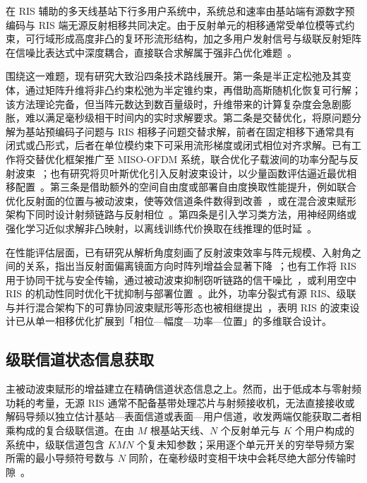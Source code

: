 在 RIS 辅助的多天线基站下行多用户系统中，系统总和速率由基站端有源数字预编码与 RIS 端无源反射相移共同决定。由于反射单元的相移通常受单位模等式约束，可行域形成高度非凸的复环形流形结构，加之多用户发射信号与级联反射矩阵在信噪比表达式中深度耦合，直接联合求解属于强非凸优化难题~\cite{wu2019intelligent}。

围绕这一难题，现有研究大致沿四条技术路线展开。第一条是半正定松弛及其变体，通过矩阵升维将非凸约束松弛为半定锥约束，再借助高斯随机化恢复可行解；该方法理论完备，但当阵元数达到数百量级时，升维带来的计算复杂度会急剧膨胀，难以满足毫秒级相干时间内的实时求解要求。第二条是交替优化，将原问题分解为基站预编码子问题与 RIS 相移子问题交替求解，前者在固定相移下通常具有闭式或凸形式，后者在单位模约束下可采用流形梯度或闭式相位对齐求解。已有工作将交替优化框架推广至 MISO-OFDM 系统，联合优化子载波间的功率分配与反射波束~\cite{feng2021ris}；也有研究将贝叶斯优化引入反射波束设计，以少量函数评估逼近最优相移配置~\cite{wang2022ris}。第三条是借助额外的空间自由度或部署自由度换取性能提升，例如联合优化反射面的位置与被动波束，使等效信道条件数得到改善~\cite{guo2023ris}，或在混合波束赋形架构下同时设计射频链路与反射相位~\cite{saqib2024ris}。第四条是引入学习类方法，用神经网络或强化学习近似求解非凸映射，以离线训练代价换取在线推理的低时延~\cite{yang2021deep,yuan2024ris}。

在性能评估层面，已有研究从解析角度刻画了反射波束效率与阵元规模、入射角之间的关系，指出当反射面偏离镜面方向时阵列增益会显著下降~\cite{stratidakis2021ris}；也有工作将 RIS 用于协同干扰与安全传输，通过被动波束抑制窃听链路的信干噪比~\cite{li2022ris}，或利用空中 RIS 的机动性同时优化干扰抑制与部署位置~\cite{tang2021ris}。此外，功率分裂式有源 RIS、级联与并行混合架构下的可靠协同波束赋形等形态也被相继提出~\cite{ma2023ris,elsherbini2023ris}，表明 RIS 的波束设计已从单一相移优化扩展到「相位—幅度—功率—位置」的多维联合设计。

\subsection{级联信道状态信息获取}

主被动波束赋形的增益建立在精确信道状态信息之上。然而，出于低成本与零射频功耗的考量，无源 RIS 通常不配备基带处理芯片与射频接收机，无法直接接收或解码导频以独立估计基站—表面信道或表面—用户信道，收发两端仅能获取二者相乘构成的复合级联信道。在由 $M$ 根基站天线、$N$ 个反射单元与 $K$ 个用户构成的系统中，级联信道包含 $KMN$ 个复未知参数；采用逐个单元开关的穷举导频方案所需的最小导频符号数与 $N$ 同阶，在毫秒级时变相干块中会耗尽绝大部分传输时隙~\cite{mao2021ris}。

